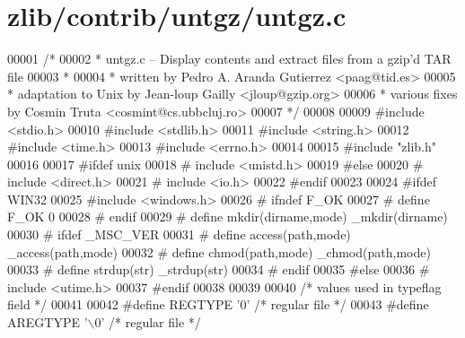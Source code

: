 \hypertarget{zlib_2contrib_2untgz_2untgz_8c_source}{}\section{zlib/contrib/untgz/untgz.c}
\label{zlib_2contrib_2untgz_2untgz_8c_source}

\begin{DoxyCode}
00001 \textcolor{comment}{/*}
00002 \textcolor{comment}{ * untgz.c -- Display contents and extract files from a gzip'd TAR file}
00003 \textcolor{comment}{ *}
00004 \textcolor{comment}{ * written by Pedro A. Aranda Gutierrez <paag@tid.es>}
00005 \textcolor{comment}{ * adaptation to Unix by Jean-loup Gailly <jloup@gzip.org>}
00006 \textcolor{comment}{ * various fixes by Cosmin Truta <cosmint@cs.ubbcluj.ro>}
00007 \textcolor{comment}{ */}
00008 
00009 \textcolor{preprocessor}{#include <stdio.h>}
00010 \textcolor{preprocessor}{#include <stdlib.h>}
00011 \textcolor{preprocessor}{#include <string.h>}
00012 \textcolor{preprocessor}{#include <time.h>}
00013 \textcolor{preprocessor}{#include <errno.h>}
00014 
00015 \textcolor{preprocessor}{#include "zlib.h"}
00016 
00017 \textcolor{preprocessor}{#ifdef unix}
00018 \textcolor{preprocessor}{#  include <unistd.h>}
00019 \textcolor{preprocessor}{#else}
00020 \textcolor{preprocessor}{#  include <direct.h>}
00021 \textcolor{preprocessor}{#  include <io.h>}
00022 \textcolor{preprocessor}{#endif}
00023 
00024 \textcolor{preprocessor}{#ifdef WIN32}
00025 \textcolor{preprocessor}{#include <windows.h>}
00026 \textcolor{preprocessor}{#  ifndef F\_OK}
00027 \textcolor{preprocessor}{#    define F\_OK  0}
00028 \textcolor{preprocessor}{#  endif}
00029 \textcolor{preprocessor}{#  define mkdir(dirname,mode)   \_mkdir(dirname)}
00030 \textcolor{preprocessor}{#  ifdef \_MSC\_VER}
00031 \textcolor{preprocessor}{#    define access(path,mode)   \_access(path,mode)}
00032 \textcolor{preprocessor}{#    define chmod(path,mode)    \_chmod(path,mode)}
00033 \textcolor{preprocessor}{#    define strdup(str)         \_strdup(str)}
00034 \textcolor{preprocessor}{#  endif}
00035 \textcolor{preprocessor}{#else}
00036 \textcolor{preprocessor}{#  include <utime.h>}
00037 \textcolor{preprocessor}{#endif}
00038 
00039 
00040 \textcolor{comment}{/* values used in typeflag field */}
00041 
00042 \textcolor{preprocessor}{#define REGTYPE  '0'            }\textcolor{comment}{/* regular file */}\textcolor{preprocessor}{}
00043 \textcolor{preprocessor}{#define AREGTYPE '\(\backslash\)0'           }\textcolor{comment}{/* regular file */}\textcolor{preprocessor}{}

\end{DoxyCode}
